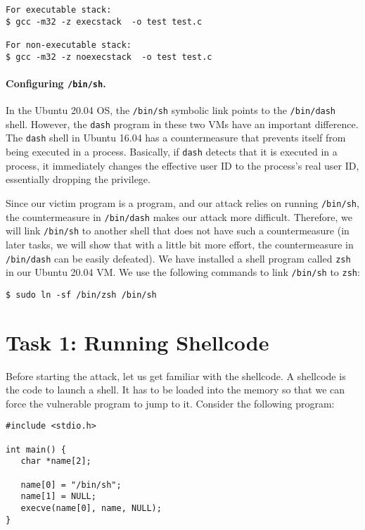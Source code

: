 \begin{lstlisting}
For executable stack:
$ gcc -m32 -z execstack  -o test test.c

For non-executable stack:
$ gcc -m32 -z noexecstack  -o test test.c
\end{lstlisting}



\paragraph{Configuring \texttt{/bin/sh}.} In the Ubuntu 20.04 OS,
the \texttt{/bin/sh} symbolic link points to
the \texttt{/bin/dash} shell. However, the \texttt{dash} program 
in these two VMs have an important difference. 
The \texttt{dash} shell in Ubuntu 16.04 has a countermeasure
that prevents itself from being executed in a \setuid process. 
Basically, if \texttt{dash} detects that it is 
executed in a \setuid process, it immediately 
changes the effective user ID to the process's real user ID, essentially
dropping the privilege. 


Since our victim program is a \setuid program, and our 
attack relies on running \texttt{/bin/sh}, the countermeasure
in \texttt{/bin/dash} makes our attack more difficult. Therefore,
we will link \texttt{/bin/sh} to another shell that does not 
have such a countermeasure (in later tasks, we will show that with
a little bit more effort, the countermeasure in \texttt{/bin/dash}
can be easily defeated). We have installed a shell program 
called \texttt{zsh} in our Ubuntu 20.04 VM. We use the following
commands to link \texttt{/bin/sh} to \texttt{zsh}:

\begin{lstlisting}
$ sudo ln -sf /bin/zsh /bin/sh
\end{lstlisting}


\section{Task 1: Running Shellcode}


Before starting the attack, let us get familiar with the shellcode. A shellcode is the code to
launch a shell. It has to be loaded into the memory so that we can force the
vulnerable program to jump to it. Consider the following program:


\begin{lstlisting}
#include <stdio.h>

int main() {
   char *name[2];

   name[0] = "/bin/sh";
   name[1] = NULL;
   execve(name[0], name, NULL);
}
\end{lstlisting}
 

